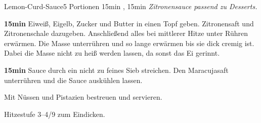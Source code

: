 \documentclass[../recipe-collections/cooking.tex]{subfiles}
\begin{document}
\begin{recipe}{Lemon-Curd-Sauce}{5 Portionen }{15min , 15min }
  \freeform{}\textit{Zitronensauce passend zu Desserts.}


  \textbf{15min}
  Eiweiß, Eigelb, Zucker und Butter in einen Topf geben.
  Zitronensaft und Zitronenschale dazugeben.
  Anschließend alles bei mittlerer Hitze unter Rühren erwärmen.
  Die Masse unterrühren und so lange erwärmen bis sie dick cremig ist.
  Dabei die Masse nicht zu heiß werden lassen, da sonst das Ei gerinnt.


  \textbf{15min}
  Sauce durch ein nicht zu feines Sieb streichen.
  Den Maracujasaft unterrühren und die Sauce auskühlen lassen.


  Mit Nüssen und Pistazien bestreuen und servieren.

  \freeform{}\hrulefill{}

  \freeform{}
  Hitzestufe 3–4/9 zum Eindicken.

\end{recipe}
\end{document}
